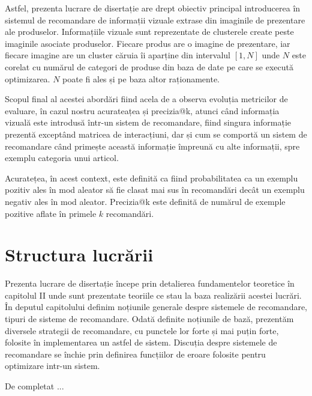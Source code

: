 Astfel, prezenta lucrare de disertație are drept obiectiv principal introducerea în sistemul de recomandare de informații vizuale extrase din imaginile de prezentare ale produselor. Informațiile vizuale sunt reprezentate de clusterele create peste imaginile asociate produselor. Fiecare produs are o imagine de prezentare, iar fiecare imagine are un cluster căruia îi aparține din intervalul $[1, N]$ unde $N$ este corelat cu numărul de categori de produse din baza de date pe care se execută optimizarea. $N$ poate fi ales și pe baza altor raționamente.

Scopul final al acestei abordări fiind acela de a observa evoluția metricilor de evaluare, în cazul nostru acurateațea și precizia@k, atunci când informația vizuală este introdusă într-un sistem de recomandare, fiind singura informație prezentă exceptând matricea de interacțiuni, dar și cum se comportă un sistem de recomandare când primește această informație împreună cu alte informații, spre exemplu categoria unui articol.

Acuratețea, în acest context, este definită ca fiind probabilitatea ca un exemplu pozitiv ales în mod aleator să fie clasat mai sus în recomandări decât un exemplu negativ ales în mod aleator. Precizia@k este definită de numărul de exemple pozitive aflate în primele $k$ recomandări.

\section{Structura lucrării}
Prezenta lucrare de disertație începe prin detalierea fundamentelor teoretice în capitolul II unde sunt prezentate teoriile ce stau la baza realizării acestei lucrări. În deputul capitolului definim noțiunile generale despre sistemele de recomandare, tipuri de sisteme de recomandare. Odată definite noțiunile de bază, prezentăm diversele strategii de recomandare, cu punctele lor forte și mai puțin forte, folosite în implementarea un astfel de sistem. Discuția despre sistemele de recomandare se închie prin definirea funcțiilor de eroare folosite pentru optimizare intr-un sistem.

\vspace{5mm}
De completat ...